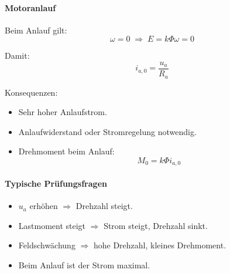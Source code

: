 \paragraph{Motoranlauf}

Beim Anlauf gilt:
\[
\omega = 0 \;\Rightarrow\; E = k\Phi \omega = 0
\]

Damit:
\[
\boxed{i_{a,0} = \frac{u_a}{R_a}}
\]

Konsequenzen:
\begin{itemize}
\item Sehr hoher Anlaufstrom.
\item Anlaufwiderstand oder Stromregelung notwendig.
\item Drehmoment beim Anlauf:
\[
\boxed{M_0 = k\Phi i_{a,0}}
\]
\end{itemize}

\paragraph{Typische Prüfungsfragen}

\begin{itemize}
\item $u_a$ erhöhen $\Rightarrow$ Drehzahl steigt.
\item Lastmoment steigt $\Rightarrow$ Strom steigt, Drehzahl sinkt.
\item Feldschwächung $\Rightarrow$ hohe Drehzahl, kleines Drehmoment.
\item Beim Anlauf ist der Strom maximal.
\end{itemize}


